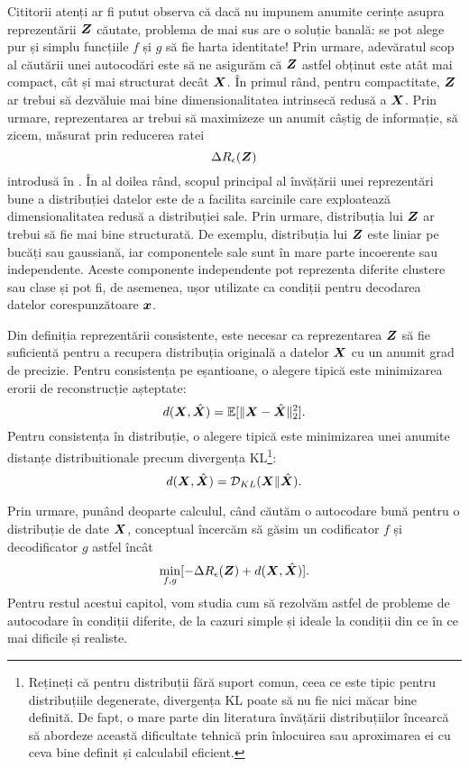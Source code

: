 \documentclass[../../book-main_ro.tex]{subfiles}
\begin{document}
Cititorii atenți ar fi putut observa că dacă nu impunem anumite
cerințe asupra reprezentării $\bm{Z}$ căutate, problema de mai sus are
o soluție banală: se pot alege pur și simplu funcțiile $f$ și $g$
să fie harta identitate! Prin urmare, adevăratul scop al căutării unei
autocodări este să ne asigurăm că $\bm{Z}$ astfel obținut este atât mai
compact, cât și mai structurat decât $\bm{X}$. În primul rând, pentru compactitate, $\bm{Z}$
ar trebui să dezvăluie mai bine dimensionalitatea intrinsecă redusă a $\bm{X}$.
Prin urmare, reprezentarea ar trebui să maximizeze un anumit câștig
de informație, să zicem, măsurat prin reducerea ratei
\begin{equation}
  \Delta R_{\epsilon}(\bm{Z})
\end{equation}
introdusă în . În al doilea rând, scopul principal al
învățării unei reprezentări bune a distribuției datelor este de a
facilita sarcinile care exploatează dimensionalitatea redusă a
distribuției sale. Prin urmare, distribuția lui $\bm{Z}$ ar trebui să fie mai bine
structurată. De exemplu, distribuția lui $\bm{Z}$ este liniar pe bucăți
sau gaussiană, iar componentele sale sunt în mare parte incoerente sau independente. Aceste componente independente pot reprezenta diferite clustere sau
clase și pot fi, de asemenea, ușor utilizate ca condiții pentru decodarea
datelor corespunzătoare $\bm{x}$.

Din definiția reprezentării consistente, este necesar ca
reprezentarea $\bm{Z}$ să fie suficientă pentru a recupera distribuția originală
a datelor $\bm{X}$ cu un anumit grad de precizie. Pentru consistența
pe eșantioane, o alegere tipică este minimizarea erorii de reconstrucție așteptate:
\begin{equation}
  d(\bm{X}, \hat {\bm{X}}) = \mathbb{E}[\|\bm{X} - \hat{\bm{X}}\|_2^2].
\end{equation}
Pentru consistența în distribuție, o alegere tipică este minimizarea unei
anumite distanțe distribuitionale precum divergența
KL\footnote{Rețineți că pentru distribuții fără suport comun,
  ceea ce este tipic pentru distribuțiile degenerate, divergența KL
  poate să nu fie nici măcar bine definită. De fapt, o mare parte din literatura
  învățării distribuțiilor încearcă să abordeze această dificultate tehnică prin
  înlocuirea sau aproximarea ei cu ceva bine definit și
calculabil eficient.}:
\begin{equation}
  d(\bm{X}, \hat {\bm{X}}) = \mathcal{D}_{KL}(\bm{X}\|\hat{\bm{X}}).
\end{equation}

Prin urmare, punând deoparte calculul, când căutăm o autocodare bună pentru o distribuție
de date $\bm{X}$, conceptual încercăm să găsim un codificator $f$ și
decodificator $g$ astfel încât
\begin{equation}
  \min_{f, g} [- \Delta R_{\epsilon}(\bm{Z}) + d(\bm{X}, \hat {\bm{X}})].
  \label{eqn:autoencode-objective-ch5}
\end{equation}
Pentru restul acestui capitol, vom studia cum să rezolvăm astfel de
probleme de autocodare în condiții diferite, de la cazuri simple și
ideale la condiții din ce în ce mai dificile și realiste.
\end{document}
